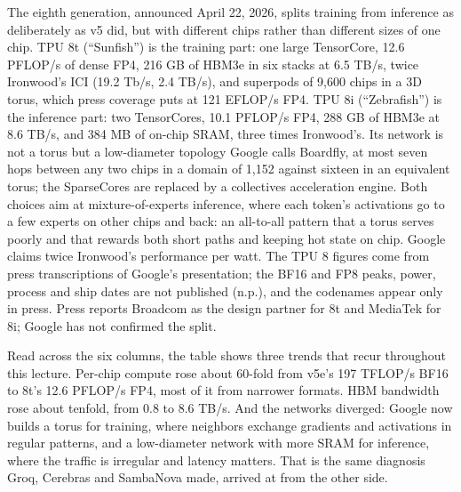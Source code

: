 \documentclass[11pt,letterpaper]{article}
\begin{document}
The eighth generation, announced April 22, 2026, splits training from inference as deliberately as v5 did, but with different chips rather than different sizes of one chip. TPU 8t (``Sunfish'') is the training part: one large TensorCore, 12.6 PFLOP/s of dense FP4, 216 GB of HBM3e in six stacks at 6.5 TB/s, twice Ironwood's ICI (19.2 Tb/s, 2.4 TB/s), and superpods of 9{,}600 chips in a 3D torus, which press coverage puts at 121 EFLOP/s FP4. TPU 8i (``Zebrafish'') is the inference part: two TensorCores, 10.1 PFLOP/s FP4, 288 GB of HBM3e at 8.6 TB/s, and 384 MB of on-chip SRAM, three times Ironwood's. Its network is not a torus but a low-diameter topology Google calls Boardfly, at most seven hops between any two chips in a domain of 1{,}152 against sixteen in an equivalent torus; the SparseCores are replaced by a collectives acceleration engine. Both choices aim at mixture-of-experts inference, where each token's activations go to a few experts on other chips and back: an all-to-all pattern that a torus serves poorly and that rewards both short paths and keeping hot state on chip. Google claims twice Ironwood's performance per watt. The TPU 8 figures come from press transcriptions of Google's presentation; the BF16 and FP8 peaks, power, process and ship dates are not published (n.p.), and the codenames appear only in press. Press reports Broadcom as the design partner for 8t and MediaTek for 8i; Google has not confirmed the split.

Read across the six columns, the table shows three trends that recur throughout this lecture. Per-chip compute rose about 60-fold from v5e's 197 TFLOP/s BF16 to 8t's 12.6 PFLOP/s FP4, most of it from narrower formats. HBM bandwidth rose about tenfold, from 0.8 to 8.6 TB/s. And the networks diverged: Google now builds a torus for training, where neighbors exchange gradients and activations in regular patterns, and a low-diameter network with more SRAM for inference, where the traffic is irregular and latency matters. That is the same diagnosis Groq, Cerebras and SambaNova made, arrived at from the other side.
\end{document}
